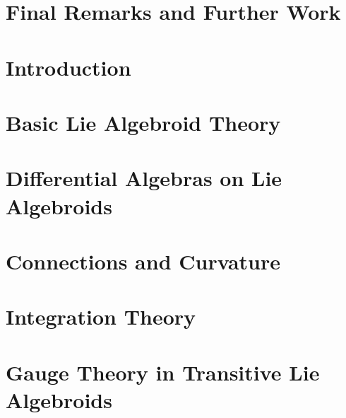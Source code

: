 \documentclass[12pt]{report}
\theoremstyle{definition}
\begin{document}
\chapter*{Final Remarks and Further Work}
 \label{chp:remarks}

\setcounter{chapter}{-1}
\chapter{Introduction}\label{chp:intro}


\chapter{Basic Lie Algebroid Theory}\label{chp:basicLie}


\chapter{Differential Algebras on Lie Algebroids}\label{chp:diffStruc}


\chapter{Connections and Curvature}\label{chp:connections}


\chapter{Integration Theory}\label{chp:integration}


\chapter{Gauge Theory in Transitive Lie Algebroids}\label{chp:gaugeTh}


\printbibliography
\end{document}
